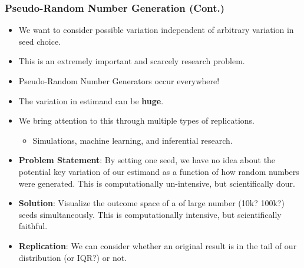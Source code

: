 \documentclass[12pt]{beamer}
\begin{document}
\begin{frame}
\frametitle{Pseudo-Random Number Generation (Cont.)}
	\begin{itemize}
 		\item We want to consider possible variation independent of arbitrary variation in seed choice.\vspace{.1in}\pause
		\item This is an extremely important and scarcely research problem.\vspace{.1in}\pause
		\item Pseudo-Random Number Generators occur \color{myblue}everywhere\color{black}!\\ \vspace{.1in}\pause
		\item The variation in estimand can be \color{myblue} \textbf{huge}\color{black}.\\ \vspace{.1in}\pause
		\item We bring attention to this through multiple types of replications.\\ \vspace{.05in}
		\begin{itemize}
			\item Simulations, machine learning, and inferential research.
		\end{itemize}
	\end{itemize}
\end{frame}


\begin{frame}
\begin{itemize}
\item \textbf{\color{myred}Problem Statement\color{black}}: By setting one seed, we have no idea about the potential key variation of our estimand as a function of how random numbers were generated. This is computationally un-intensive, but scientifically dour.\\ \pause \vspace{.2in}
\item \textbf{\color{myred}Solution\color{black}}: Visualize the outcome space of a of large number (10k? 100k?) seeds simultaneously. This is computationally intensive, but scientifically faithful.\\ \pause \vspace{.2in}
\item \textbf{\color{myred}Replication\color{black}}: We can consider whether an original result is in the tail of our distribution (or IQR?) or not.\\ \vspace{.2in}
\end{itemize}
\end{frame}
\end{document}

